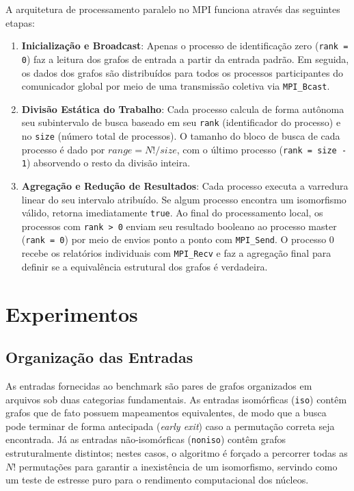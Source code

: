 \documentclass[12pt,a4paper]{article}
\begin{document}
A arquitetura de processamento paralelo no MPI funciona através das seguintes etapas:
\begin{enumerate}
    \item \textbf{Inicialização e Broadcast}:
    Apenas o processo de identificação zero (\texttt{rank = 0}) faz a leitura dos grafos de entrada a partir da entrada padrão.
    Em seguida,
    os dados dos grafos são distribuídos para todos os processos participantes do comunicador global por meio de uma transmissão coletiva via \texttt{MPI\_Bcast}.
    \item \textbf{Divisão Estática do Trabalho}:
    Cada processo calcula de forma autônoma seu subintervalo de busca baseado em seu \texttt{rank} (identificador do processo) e no \texttt{size} (número total de processos).
    O tamanho do bloco de busca de cada processo é dado por $range = N! / size$,
    com o último processo (\texttt{rank = size - 1}) absorvendo o resto da divisão inteira.
    \item \textbf{Agregação e Redução de Resultados}:
    Cada processo executa a varredura linear do seu intervalo atribuído.
    Se algum processo encontra um isomorfismo válido,
    retorna imediatamente \texttt{true}.
    Ao final do processamento local,
    os processos com \texttt{rank > 0} enviam seu resultado booleano ao processo master (\texttt{rank = 0}) por meio de envios ponto a ponto com \texttt{MPI\_Send}.
    O processo 0 recebe os relatórios individuais com \texttt{MPI\_Recv} e faz a agregação final para definir se a equivalência estrutural dos grafos é verdadeira.
\end{enumerate}

\section{Experimentos}

\subsection{Organização das Entradas}

As entradas fornecidas ao benchmark são pares de grafos organizados em arquivos sob duas categorias fundamentais.
As entradas isomórficas (\texttt{iso}) contêm grafos que de fato possuem mapeamentos equivalentes,
de modo que a busca pode terminar de forma antecipada (\textit{early exit}) caso a permutação correta seja encontrada.
Já as entradas não-isomórficas (\texttt{noniso}) contêm grafos estruturalmente distintos;
nestes casos,
o algoritmo é forçado a percorrer todas as $N!$ permutações para garantir a inexistência de um isomorfismo,
servindo como um teste de estresse puro para o rendimento computacional dos núcleos.
\end{document}
